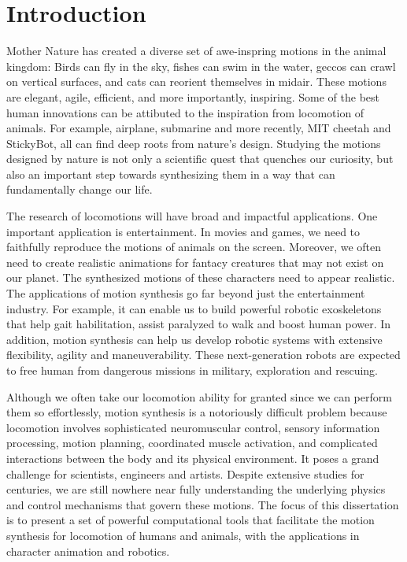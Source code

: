 \chapter{Introduction}

Mother Nature has created a diverse set of awe-inspring motions in the animal kingdom: Birds can fly in the sky, fishes can swim in the water, geccos can crawl on vertical surfaces, and cats can reorient themselves in midair. These motions are elegant, agile, efficient, and more importantly, inspiring. Some of the best human innovations can be attibuted to the inspiration from locomotion of animals. For example, airplane, submarine and more recently, MIT cheetah and StickyBot, all can find deep roots from nature's design. Studying the motions designed by nature is not only a scientific quest that quenches our curiosity, but also an important step towards synthesizing them in a way that can fundamentally change our life.

The research of locomotions will have broad and impactful applications. One important application is entertainment. In movies and games, we need to faithfully reproduce the motions of animals on the screen. Moreover, we often need to create realistic animations for fantacy creatures that may not exist on our planet. The synthesized motions of these characters need to appear realistic. The applications of motion synthesis go far beyond just the entertainment industry. For example, it can enable us to build powerful robotic exoskeletons that help gait habilitation, assist paralyzed to walk and boost human power. In addition, motion synthesis can help us develop robotic systems with extensive flexibility, agility and maneuverability. These next-generation robots are expected to free human from dangerous missions in military, exploration and rescuing. 

Although we often take our locomotion ability for granted since we can perform them so effortlessly, motion synthesis is a notoriously difficult problem because locomotion involves sophisticated neuromuscular control, sensory information processing, motion planning, coordinated muscle activation, and complicated interactions between the body and its physical environment. It poses a grand challenge for scientists, engineers and artists. Despite extensive studies for centuries, we are still nowhere near fully understanding the underlying physics and control mechanisms that govern these motions. The focus of this dissertation is to present a set of powerful computational tools that facilitate the motion synthesis for locomotion of humans and animals, with the applications in character animation and robotics.

